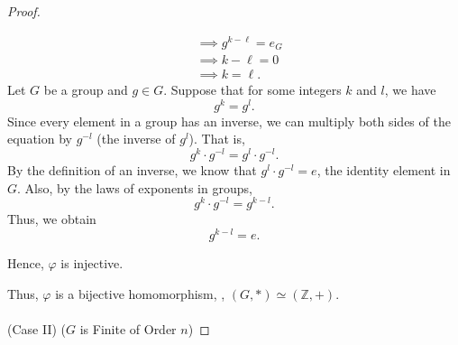 \documentclass[11pt,openany]{article}
\begin{document}
\begin{proof}
\begin{enumerate}[(i)]
\begin{align*}
			&\implies g^{k-\ell}=e_G\\
			&\implies k-\ell=0\\
			&\implies k=\ell.
		\end{align*}
	Let \(G\) be a group and \(g\in G\). Suppose that for some integers \(k\) and \(l\), we have
	\[
	g^k = g^l.
	\]
	Since every element in a group has an inverse, we can multiply both sides of the equation by \(g^{-l}\) (the inverse of \(g^l\)). That is,
	\[
	g^k \cdot g^{-l} = g^l \cdot g^{-l}.
	\]
	By the definition of an inverse, we know that \(g^l \cdot g^{-l} = e\), the identity element in \(G\). Also, by the laws of exponents in groups,
	\[
	g^k \cdot g^{-l} = g^{k-l}.
	\]
	Thus, we obtain
	\[
	g^{k-l} = e.
	\]
	
		Hence, \(\varphi\) is injective.
	\end{enumerate}
	Thus, \(\varphi\) is a bijective homomorphism, \ie, $(G,\ast) \simeq (\mathbb{Z},+)$.\ \\
	\ \\
	\noindent
	(Case II)\; (\(G\) is Finite of Order \(n\))


\end{proof}
\end{document}
